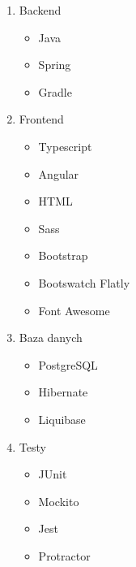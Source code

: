 \begin{enumerate}
    \item Backend
    \begin{itemize}
        \item Java \cite{tech:java}
        \item Spring \cite{tech:spring}
        \item Gradle \cite{tech:gradle}
    \end{itemize}

    \item Frontend
    \begin{itemize}
        \item Typescript \cite{tech:typescript}
        \item Angular \cite{tech:angular}
        \item HTML \cite{tech:html}
        \item Sass \cite{tech:sass}
        \item Bootstrap \cite{tech:bootstrap}
        \item Bootswatch Flatly \cite{tech:bootswatch}
        \item Font Awesome \cite{tech:font-awesome}
    \end{itemize}

    \item Baza danych
    \begin{itemize}
        \item PostgreSQL \cite{tech:postgresql}
        \item Hibernate \cite{tech:hibernate}
        \item Liquibase \cite{tech:liquibase}
    \end{itemize}

    \item Testy
    \begin{itemize}
        \item JUnit\cite{tech:junit}
        \item Mockito \cite{tech:mockito}
        \item Jest \cite{tech:jest}
        \item Protractor \cite{tech:protractor}
    \end{itemize}


\end{enumerate}
